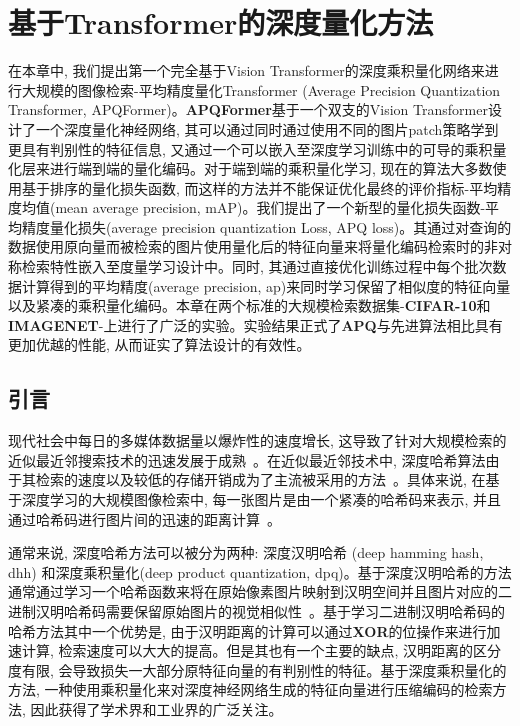 \chapter{基于Transformer的深度量化方法}
在本章中, 我们提出第一个完全基于Vision Transformer的深度乘积量化网络来进行大规模的图像检索-平均精度量化Transformer (Average Precision Quantization Transformer, APQFormer)。\textbf{APQFormer}基于一个双支的Vision Transformer设计了一个深度量化神经网络, 其可以通过同时通过使用不同的图片patch策略学到更具有判别性的特征信息, 又通过一个可以嵌入至深度学习训练中的可导的乘积量化层来进行端到端的量化编码。对于端到端的乘积量化学习, 现在的算法大多数使用基于排序的量化损失函数, 而这样的方法并不能保证优化最终的评价指标-平均精度均值(mean average precision, mAP)。我们提出了一个新型的量化损失函数-平均精度量化损失(average precision quantization Loss, APQ loss)。其通过对查询的数据使用原向量而被检索的图片使用量化后的特征向量来将量化编码检索时的非对称检索特性嵌入至度量学习设计中。同时, 其通过直接优化训练过程中每个批次数据计算得到的平均精度(average precision, ap)来同时学习保留了相似度的特征向量以及紧凑的乘积量化编码。本章在两个标准的大规模检索数据集-\textbf{CIFAR-10}和\textbf{IMAGENET}-上进行了广泛的实验。实验结果正式了\textbf{APQ}与先进算法相比具有更加优越的性能, 从而证实了算法设计的有效性。
\section{引言}
现代社会中每日的多媒体数据量以爆炸性的速度增长, 这导致了针对大规模检索的近似最近邻搜索技术的迅速发展于成熟~\cite{andoni2006near,shrivastava2014densifying, malkov2018efficient, nie2020deep, li2021dahp}。在近似最近邻技术中, 深度哈希算法由于其检索的速度以及较低的存储开销成为了主流被采用的方法~\cite{zhu2016deep, jiang2018asymmetric, zhang2019improved, cao2017hashnet}。具体来说, 在基于深度学习的大规模图像检索中, 每一张图片是由一个紧凑的哈希码来表示, 并且通过哈希码进行图片间的迅速的距离计算~\cite{jang2020generalized}。\par
通常来说, 深度哈希方法可以被分为两种: 深度汉明哈希 (deep hamming hash, dhh) 和深度乘积量化(deep product quantization, dpq)。基于深度汉明哈希的方法通常通过学习一个哈希函数来将在原始像素图片映射到汉明空间并且图片对应的二进制汉明哈希码需要保留原始图片的视觉相似性~\cite{zhu2016deep,zhang2019improved, cao2017hashnet, cao2018deep, fan2020deep}。基于学习二进制汉明哈希码的哈希方法其中一个优势是, 由于汉明距离的计算可以通过\textbf{XOR}的位操作来进行加速计算, 检索速度可以大大的提高。但是其也有一个主要的缺点, 汉明距离的区分度有限, 会导致损失一大部分原特征向量的有判别性的特征。基于深度乘积量化的方法, 一种使用乘积量化来对深度神经网络生成的特征向量进行压缩编码的检索方法, 因此获得了学术界和工业界的广泛关注。\par

